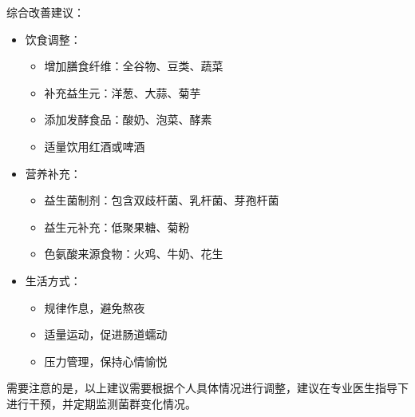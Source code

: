 \documentclass[UTF8]{ctexart}
\begin{document}
\begin{tcolorbox}[
    enhanced,
    colback=gray!3,
    colframe=gray!3,
    arc=3mm,
    boxrule=0pt,
    width=\textwidth,
    top=8pt,
    bottom=8pt
]
{{\textcolor{green!85!orange}{\faLightbulb}}\quad 综合改善建议：
\begin{itemize}
    \item 饮食调整：
    \begin{itemize}
        \item 增加膳食纤维：全谷物、豆类、蔬菜
        \item 补充益生元：洋葱、大蒜、菊芋
        \item 添加发酵食品：酸奶、泡菜、酵素
        \item 适量饮用红酒或啤酒
    \end{itemize}

    \item 营养补充：
    \begin{itemize}
        \item 益生菌制剂：包含双歧杆菌、乳杆菌、芽孢杆菌
        \item 益生元补充：低聚果糖、菊粉
        \item 色氨酸来源食物：火鸡、牛奶、花生
    \end{itemize}

    \item 生活方式：
    \begin{itemize}
        \item 规律作息，避免熬夜
        \item 适量运动，促进肠道蠕动
        \item 压力管理，保持心情愉悦
    \end{itemize}
\end{itemize}

需要注意的是，以上建议需要根据个人具体情况进行调整，建议在专业医生指导下进行干预，并定期监测菌群变化情况。
}
\end{tcolorbox}


\newpage
\end{document}

